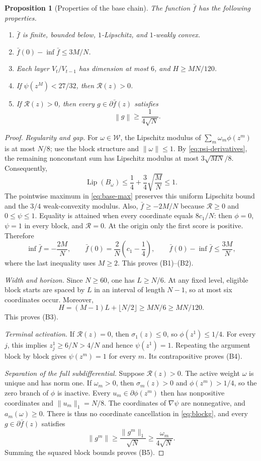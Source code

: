 \documentclass[11pt,a4paper]{article}
\newcommand{\norm}[1]{\left\lVert #1\right\rVert}
\newcommand{\cW}{\mathcal W}
\newtheorem{proposition}[theorem]{Proposition}
\theoremstyle{definition}
\numberwithin{equation}{section}
\newcommand{\Lip}{\operatorname{Lip}}
\begin{document}
\begin{proposition}[Properties of the base chain]\label{prop:base}
The function $\bar f$ has the following properties.
\begin{enumerate}[label=(B\arabic*)]
\item $\bar f$ is finite, bounded below, $1$-Lipschitz, and $1$-weakly convex.
\item $\bar f(0)-\inf\bar f\le3M/N$.
\item Each layer $V_t/V_{t-1}$ has dimension at most $6$, and $H\ge MN/120$.
\item If $\psi(z^M)<27/32$, then $\mathcal R(z)>0$.
\item If $\mathcal R(z)>0$, then every $g\in\partial\bar f(z)$ satisfies
\[
 \norm g\ge\frac1{4\sqrt N}.
\]
\end{enumerate}
\end{proposition}

\begin{proof}
\emph{Regularity and gap.}
For $\omega\in\cW$, the Lipschitz modulus of
$\sum_m\omega_m\phi(z^m)$ is at most $N/8$; use the block structure and
$\|\omega\|\le1$. By \eqref{eq:psi-derivatives}, the remaining
nonconstant sum has Lipschitz modulus at most $3\sqrt{MN}/8$.
Consequently,
\[
 \Lip(B_\omega)\le\frac14+\frac34\sqrt{\frac MN}\le1.
\]
The pointwise maximum in \eqref{eq:base-max} preserves this uniform
Lipschitz bound and the $3/4$ weak-convexity modulus. Also,
$\bar f\ge-2M/N$ because $\mathcal R\ge0$ and $0\le\psi\le1$.
Equality is attained when every coordinate equals $8c_1/N$: then
$\phi=0$, $\psi=1$ in every block, and $\mathcal R=0$.
At the origin only the first score is positive. Therefore
\[
 \inf\bar f=-\frac{2M}{N},\qquad
 \bar f(0)=\frac2N\left(c_1-\frac14\right),\qquad
 \bar f(0)-\inf\bar f\le\frac{3M}{N},
\]
where the last inequality uses $M\ge2$. This proves (B1)--(B2).

\emph{Width and horizon.}
Since $N\ge60$, one has $L\ge N/6$. At any fixed level, eligible
block starts are spaced by $L$ in an interval of length $N-1$, so
at most six coordinates occur. Moreover,
\[
 H=(M-1)L+\lfloor N/2\rfloor\ge MN/6\ge MN/120.
\]
This proves (B3).

\emph{Terminal activation.}
If $\mathcal R(z)=0$, then $\sigma_1(z)\le0$, so $\phi(z^1)\le1/4$.
For every $j$, this implies $z_j^1\ge6/N>4/N$ and hence
$\psi(z^1)=1$. Repeating the argument block by block gives
$\psi(z^m)=1$ for every $m$. Its contrapositive proves (B4).

\emph{Separation of the full subdifferential.}
Suppose $\mathcal R(z)>0$. The active weight $\omega$ is unique and
has norm one. If $\omega_m>0$, then $\sigma_m(z)>0$ and
$\phi(z^m)>1/4$, so the zero branch of $\phi$ is inactive.
Every $u_m\in\partial\phi(z^m)$ then has nonpositive coordinates and
$\|u_m\|_1=N/8$. The coordinates of $\nabla\psi$ are nonnegative,
and $a_m(\omega)\ge0$. There is thus no coordinate cancellation in
\eqref{eq:blockg}, and every $g\in\partial\bar f(z)$ satisfies
\[
 \|g^m\|\ge\frac{\|g^m\|_1}{\sqrt N}
          \ge\frac{\omega_m}{4\sqrt N}.
\]
Summing the squared block bounds proves (B5).
\end{proof}
\end{document}
